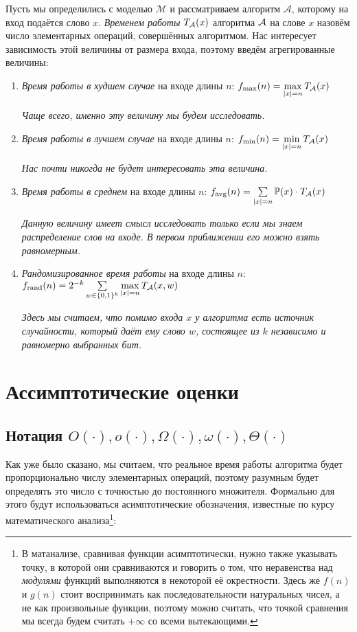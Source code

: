 \documentclass{article}
\begin{document}
Пусть мы определились с моделью $\mathcal M$ и рассматриваем алгоритм $\mathcal A$, которому на вход подаётся слово $x$. \textit{Временем работы} $T_{\mathcal{A}}(x)$ алгоритма $\mathcal{A}$ на слове $x$ назовём число элементарных операций, совершённых алгоритмом. Нас интересует зависимость этой величины от размера входа, поэтому введём агрегированные величины:

\begin{enumerate}
    \item \textit{Время работы в худшем случае} на входе длины $n$: $f_{\max}(n) = \max\limits_{|x|=n} T_{\mathcal{A}}(x)$
    
    \textit{Чаще всего, именно эту величину мы будем исследовать.}
    \item \textit{Время работы в лучшем случае} на входе длины $n$: $f_{\min}(n) = \min\limits_{|x|=n} T_{\mathcal{A}}(x)$
    
    \textit{Нас почти никогда не будет интересовать эта величина.}
    \item \textit{Время работы в среднем} на входе длины $n$: $f_{\text{avg}}(n) = \sum\limits_{|x|=n} \mathbb{P}(x) \cdot T_{\mathcal{A}}(x)$
    
    \textit{Данную величину имеет смысл исследовать только если мы знаем распределение слов на входе. В первом приближении его можно взять равномерным.}
    \item \textit{Рандомизированное время работы} на входе длины $n$: $f_{\text{rand}}(n)=2^{-k}\sum\limits_{w \in \{0,1\}^k} \max\limits_{|x|=n} T_{\mathcal{A}}(x, w)$
    
    \textit{Здесь мы считаем, что помимо входа $x$ у алгоритма есть источник случайности, который даёт ему слово $w$, состоящее из $k$ независимо и равномерно выбранных бит.}
\end{enumerate}

\section*{Ассимптотические оценки}
\subsection*{Нотация $O(\cdot), o(\cdot), \Omega(\cdot), \omega(\cdot), \Theta(\cdot)$}

Как уже было сказано, мы считаем, что реальное время работы алгоритма будет пропорционально числу элементарных операций, поэтому разумным будет определять это число с точностью до постоянного множителя. Формально для этого будут использоваться асимптотические обозначения, известные по курсу математического анализа\footnote{В матанализе, сравнивая функции асимптотически, нужно также указывать точку, в которой они сравниваются и говорить о том, что неравенства над \textit{модулями} функций выполняются в некоторой её окрестности. Здесь же $f(n)$ и $g(n)$ стоит воспринимать как последовательности натуральных чисел, а не как произвольные функции, поэтому можно считать, что точкой сравнения мы всегда будем считать $+\infty$ со всеми вытекающими.}:
\end{document}
